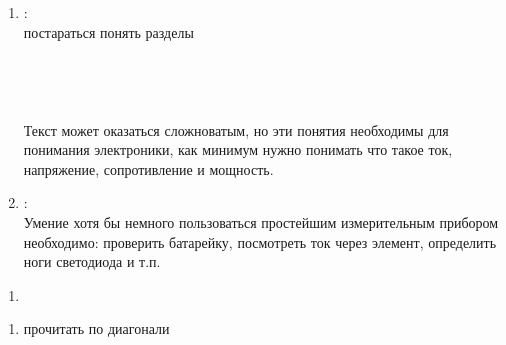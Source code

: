 \secdown\label{learnplans}



\begin{enumerate}
  \item {}:  \\ 
  постараться понять разделы\\
  \\
  \\
  \\
  \\
  Текст может оказаться сложноватым, но эти понятия необходимы
  для понимания электроники, как минимум нужно понимать что такое ток,
  напряжение, сопротивление и мощность.
  \item {}:  \\
  Умение хотя бы немного пользоваться простейшим измерительным прибором
  необходимо: проверить батарейку, посмотреть ток через элемент, определить ноги
  светодиода и т.п.
\end{enumerate}


\begin{enumerate}
  \item {}
\end{enumerate}


\begin{enumerate}
  \item {} прочитать по диагонали
\end{enumerate}

\secup
